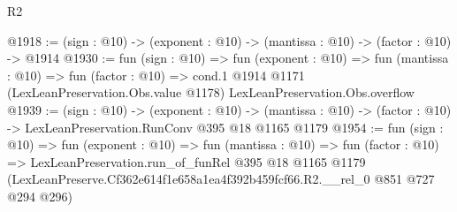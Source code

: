 \begin{lexlean}{R2}
\begin{coremodule}
@1918 := (sign : @10) -> (exponent : @10) -> (mantissa : @10) -> (factor : @10) -> @1914
@1930 := fun (sign : @10) =>
  fun (exponent : @10) =>
  fun (mantissa : @10) =>
  fun (factor : @10) =>
  cond.{1} @1914 @1171 (LexLeanPreservation.Obs.value @1178) LexLeanPreservation.Obs.overflow
@1939 := (sign : @10) ->
  (exponent : @10) ->
  (mantissa : @10) -> (factor : @10) -> LexLeanPreservation.RunConv @395 @18 @1165 @1179
@1954 := fun (sign : @10) =>
  fun (exponent : @10) =>
  fun (mantissa : @10) =>
  fun (factor : @10) =>
  LexLeanPreservation.run_of_funRel
    @395
    @18
    @1165
    @1179
    (LexLeanPreserve.Cf362e614f1e658a1ea4f392b459fcf66.R2.__rel_0 @851 @727 @294 @296)
\end{coremodule}
\end{lexlean}
